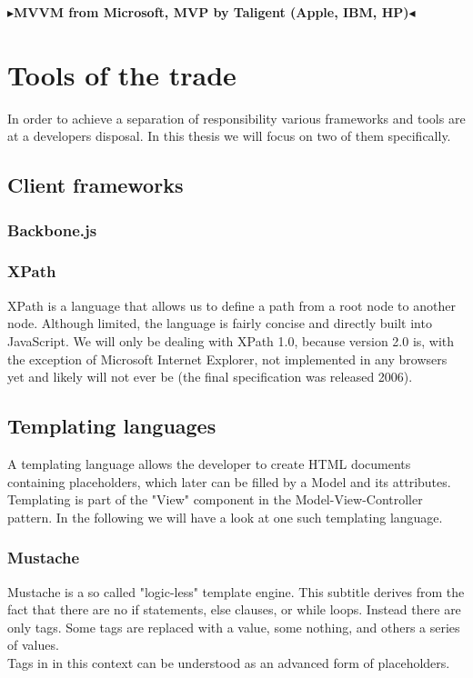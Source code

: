 \documentclass[twoside,11pt,openright]{report}
\newcommand{\todo}[1]{{\color[rgb]{.5,0,0}\textbf{$\blacktriangleright$#1$\blacktriangleleft$}}}
\begin{document}
\todo{MVVM from Microsoft, MVP by Taligent (Apple, IBM, HP)}


\chapter{Tools of the trade}
In order to achieve a separation of responsibility various frameworks and tools
are at a developers disposal. In this thesis we will focus on two of them
specifically.
\section{Client frameworks}
\subsection{Backbone.js}
\subsection{XPath}
XPath is a language that allows us to define a path from a root node to another
node. Although limited, the language is fairly concise and directly built into
JavaScript. We will only be dealing with XPath 1.0, because version 2.0 is, with
the exception of Microsoft Internet Explorer, not implemented in any browsers
yet and likely will not ever be (the final specification was released 2006).
\section{Templating languages}
A templating language allows the developer to create HTML documents containing
placeholders, which later can be filled by a Model and its attributes.
Templating is part of the "View" component in the Model-View-Controller
pattern. In the following we will have a look at one such templating language.
\subsection{Mustache}
Mustache is a so called "logic-less" template engine.
This subtitle derives from the fact that there are no if statements,
else clauses, or while loops. Instead there are only tags. Some tags are
replaced with a value, some nothing, and others a series of values.\\
Tags in in this context can be understood as an advanced form of placeholders.
\end{document}
